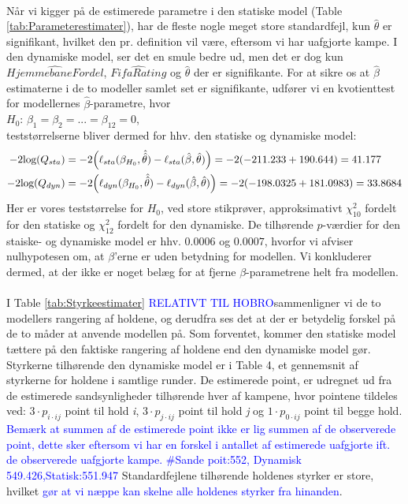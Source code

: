 \documentclass[11pt,a4paper]{article}
\begin{document}
\\Når vi kigger på de estimerede parametre i den statiske model (Table \ref{tab:Parameterestimater}), har de fleste nogle meget store standardfejl, kun $\hat{\theta}$ er signifikant, hvilket den pr. definition vil være, eftersom vi har uafgjorte kampe. I den dynamiske model, ser det en smule bedre ud, men det er dog kun $\hat{HjemmebaneFordel}$, $\hat{FifaRating}$ og $\hat{\theta}$ der er signifikante. For at sikre os at $\hat{\beta}$ estimaterne i de to modeller samlet set er signifikante, udfører vi en kvotienttest for modellernes $\hat{\beta}$-parametre, hvor  \\
$H_0$: $\beta_1=\beta_2=...=\beta_{12} = 0$,\\
teststørrelserne bliver dermed for hhv. den statiske og dynamiske model:\\
\begin{align*}
    -2\text{log}(Q_{sta})&=-2\Big{(}\ell_{sta} (\beta_{H_0}, \hat{\hat{\theta}})-\ell_{sta} (\hat{\beta},\hat{\theta})\Big{)}=-2(-211.233+190.644)=41.177\\
    -2\text{log}(Q_{dyn})&=-2\Big{(}\ell_{dyn} (\beta_{H_0},\hat{\hat{\theta}})-\ell_{dyn} (\hat{\beta},\hat{\theta})\Big{)}=-2(-198.0325+181.0983)=33.8684
\end{align*}
Her er vores teststørrelse for $H_0$, ved store stikprøver, approksimativt $\chi^2_{10}$ fordelt for den statiske og $\chi^2_{12}$ fordelt for den dynamiske. De tilhørende $p$-værdier for den staiske- og dynamiske model er hhv. $0.0006$ og $0.0007$, hvorfor vi afviser nulhypotesen om, at $\beta$'erne er uden betydning for modellen. Vi konkluderer dermed, at der ikke er noget belæg for at fjerne $\beta$-parametrene helt fra modellen. 
\\\\I Table \ref{tab:Styrkeestimater} \textcolor{blue}{RELATIVT TIL HOBRO}sammenligner vi de to modellers rangering af holdene, og derudfra ses det at der er betydelig forskel på de to måder at anvende modellen på.  Som forventet, kommer den statiske model tættere på den faktiske rangering af holdene end den dynamiske model gør. Styrkerne tilhørende den dynamiske model er i Table 4, et gennemsnit af styrkerne for holdene i samtlige runder. De estimerede point, er udregnet ud fra de estimerede sandsynligheder tilhørende hver af kampene, hvor pointene tildeles ved: $3 \cdot p_{i \cdot ij}$ point til hold \textit{i}, $3\cdot p_{j \cdot ij}$ point til hold \textit{j} og $1\cdot p_{0 \cdot ij}$ point til begge hold. \textcolor{blue}{Bemærk at summen af de estimerede point ikke er lig summen af de observerede point, dette sker eftersom vi har en forskel i antallet af estimerede uafgjorte ift. de observerede uafgjorte kampe. \#Sande poit:552, Dynamisk 549.426,Statisk:551.947} Standardfejlene tilhørende holdenes styrker er store, hvilket \textcolor{blue}{gør at vi næppe kan skelne alle holdenes styrker fra hinanden}.\\
\end{document}

